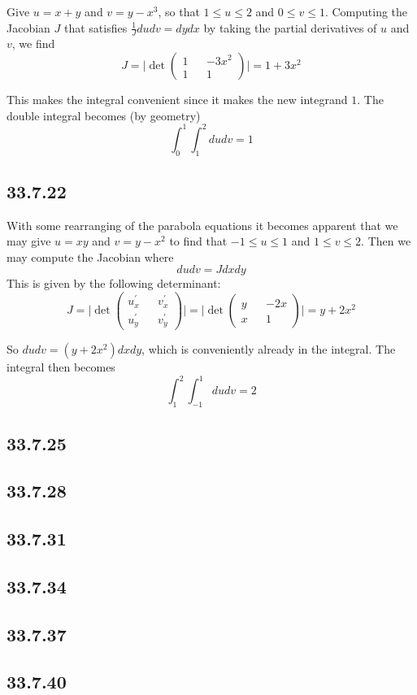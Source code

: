 \documentclass{article}
\begin{document}
Give $u=x+y$ and $v=y-x^3$, so that $1\leq u \leq 2$ and $0 \leq v \leq 1$. Computing the Jacobian $J$ that satisfies $\frac{1}{J}dudv = dydx$ by taking the partial derivatives of $u$ and $v$, we find $$J = \bigg| \det \begin{pmatrix}
    1 && -3x^2 \\
    1 && 1
\end{pmatrix} \bigg| = 1+3x^2$$

This makes the integral convenient since it makes the new integrand $1$. The double integral becomes (by geometry) $$\int_{0}^{1}\int_{1}^{2} dudv = 1$$

\subsection{33.7.22}

With some rearranging of the parabola equations it becomes apparent that we may give $u = xy$ and $v = y-x^2$ to find that $-1\leq u \leq 1$ and $1 \leq v \leq 2$. Then we may compute the Jacobian where $$dudv = Jdxdy$$  This is given by the following determinant: $$J = \bigg|\det \begin{pmatrix}
    u^{\prime}_x && v^{\prime}_x \\
    u^{\prime}_y && v^{\prime}_y
\end{pmatrix} \bigg| = \bigg|\det \begin{pmatrix}
    y && -2x \\
    x && 1
\end{pmatrix} \bigg| = y+2x^2$$

So $dudv = (y+2x^2)dxdy$, which is conveniently already in the integral. The integral then becomes $$\int_1^2\int_{-1}^1 dudv = 2$$

\subsection{33.7.25}

\subsection{33.7.28}

\subsection{33.7.31}

\subsection{33.7.34}

\subsection{33.7.37}

\subsection{33.7.40}
\end{document}

